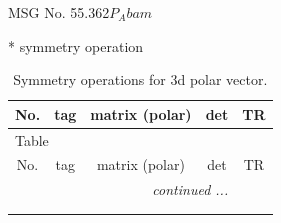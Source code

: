 \documentclass[fleqn,8pt]{jsarticle}
\begin{document}
\setcounter{MaxMatrixCols}{32}

\renewcommand{\tablename}{Table~}
\renewcommand{\figurename}{Figure~}
\begin{center}
\LARGE
MSG No. 55.362\quad$P_{A}bam$
\end{center}
* symmetry operation
\renewcommand{\arraystretch}{1.3}
\begin{longtable}{ccccc}
\caption{Symmetry operations for 3d polar vector.}
 \\
 \hline \hline
No. & tag & matrix (polar) & det & TR \\ \hline \endfirsthead

\multicolumn{4}{l}{\tablename\ \thetable{}} \\
 \hline \hline
No. & tag & matrix (polar) & det & TR \\ \hline \endhead

 \hline \hline
\multicolumn{4}{r}{\footnotesize\it continued ...} \\ \endfoot

 \hline \hline
\multicolumn{4}{r}{} \\ \endlastfoot


\end{longtable}
\end{document}
